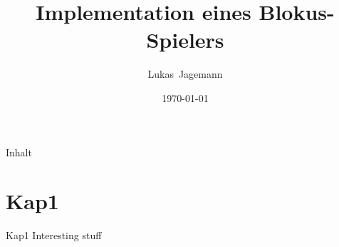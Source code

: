 \documentclass[12pt]{beamer}
\title{Implementation eines Blokus-Spielers}
\author{\mbox{Lukas Jagemann}}
\date{\today}
\begin{document}
\begin{frame}
    \vspace*{-20pt}
    \titlepage
\end{frame}

\begin{frame}{Inhalt}
    \tableofcontents
\end{frame}

\section{Kap1}
\begin{frame}{Kap1}
	Interesting stuff
\end{frame}
\end{document}
